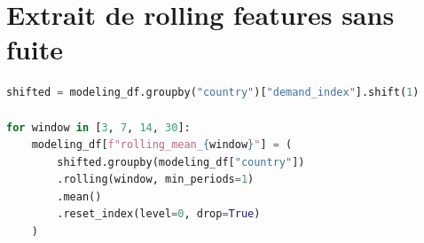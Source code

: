 \documentclass[11pt,a4paper]{report}
\begin{document}
\section{Extrait de rolling features sans fuite}

\begin{lstlisting}[language=Python]
shifted = modeling_df.groupby("country")["demand_index"].shift(1)

for window in [3, 7, 14, 30]:
    modeling_df[f"rolling_mean_{window}"] = (
        shifted.groupby(modeling_df["country"])
        .rolling(window, min_periods=1)
        .mean()
        .reset_index(level=0, drop=True)
    )
\end{lstlisting}
\end{document}
